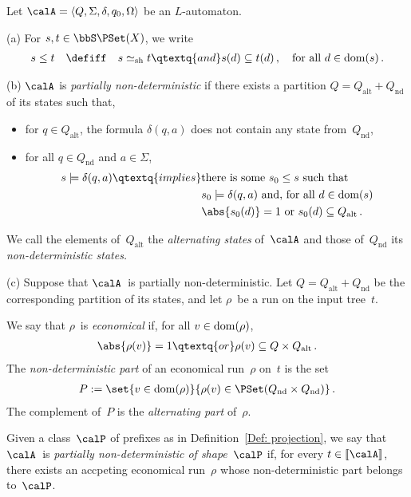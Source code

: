 \documentclass[10pt, fleqn]{scrartcl}
\DeclareRobustCommand*{\dom}{\qopname\relax o{dom}}
\newcommand*{\sh}{\mathrm{sh}}
\newcommand*{\?}{\kern .08em}
\newcommand\lsem{[\![}
\newcommand\rsem{]\!]}
\begin{document}
\begin{Def}
Let $\calA = \langle Q,\Sigma,\delta,q_0,\Omega\rangle$ be an $L$-automaton.

(a) For $s,t \in \bbS\PSet(X)$, we write
\begin{align*}
  s \leq t \quad\defiff\quad
  s \simeq_\sh t \qtextq{and} s(d) \subseteq t(d)\,, \quad\text{for all } d \in \dom(s)\,.
\end{align*}

(b)
$\calA$ is \emph{partially non-deterministic} if there exists a partition
$Q = Q_{\mathrm{alt}} + Q_{\mathrm{nd}}$ of its states such that,
\begin{itemize}
\item for $q \in Q_{\mathrm{alt}}$, the formula $\delta(q,a)$ does not contain any state
  from~$Q_{\mathrm{nd}}$,
\item for all $q \in Q_{\mathrm{nd}}$ and $a \in \Sigma$,
  \begin{align*}
    s \models \delta(q,a)
    \qtextq{implies}
    &\text{there is some } s_0 \leq s \text{ such that}\\
    &s_0 \models \delta(q,a) \text{ and, for all } d \in \dom(s) \\
    &\abs{s_0(d)} = 1 \text{ or } s_0(d) \subseteq Q_{\mathrm{alt}}\,.
  \end{align*}
\end{itemize}
We call the elements of~$Q_{\mathrm{alt}}$ the \emph{alternating states} of~$\calA$
and those of~$Q_{\mathrm{nd}}$ its \emph{non-deterministic states.}

(c) Suppose that $\calA$~is partially non-deterministic.
Let $Q = Q_{\mathrm{alt}} + Q_{\mathrm{nd}}$ be the corresponding partition of its states,
and let $\rho$~be a run on the input tree~$t$.

We say that $\rho$~is \emph{economical} if, for all $v \in \dom(\rho)$,
\begin{align*}
  \abs{\rho(v)} = 1
  \qtextq{or}
  \rho(v) \subseteq Q \times Q_{\mathrm{alt}}\,.
\end{align*}
The \emph{non-deterministic part} of an economical run~$\rho$ on~$t$ is the set
\begin{align*}
  P := \set{ v \in \dom(\rho) }{ \rho(v) \in \PSet(Q_{\mathrm{nd}} \times Q_{\mathrm{nd}}) }\,.
\end{align*}
The complement of~$P$ is the \emph{alternating part} of~$\rho$.

Given a class~$\calP$ of prefixes as in Definition~\ref{Def: projection}, we say that $\calA$~is
\emph{partially non-deterministic of shape~$\calP$} if, for every $t \in \lsem\calA\rsem$,
there exists an accpeting economical run~$\rho$ whose non-deterministic part belongs to~$\calP$.
\end{Def}
\end{document}
